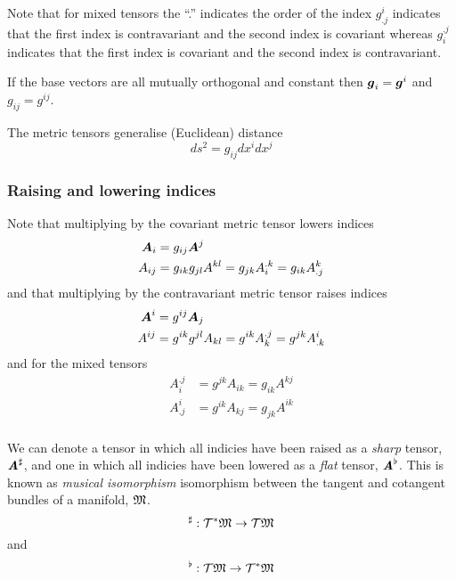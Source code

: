Note that for mixed tensors the ``.'' indicates the order of the index \ie
$g^{i}_{.j}$ indicates that the first index is contravariant and the second
index is covariant whereas $g_{i}^{.j}$ indicates that the first index is
covariant and the second index is contravariant.

If the base vectors are all mutually orthogonal and constant then
$ \boldsymbol{g} _{i}= \boldsymbol{g} ^{i}$ and $g_{ij}=g^{ij}$.

The metric tensors generalise (Euclidean) distance \ie
\begin{equation}
  ds^{2}=g_{ij}dx^{i}dx^{j}
\end{equation}

\subsubsection{Raising and lowering indices}

Note that multiplying by the covariant metric tensor lowers indices \ie
\begin{equation}
  \begin{split}
     \boldsymbol{A} _{i} &= g_{ij} \boldsymbol{A} ^{j} \\
    A_{ij} &= g_{ik}g_{jl}A^{kl} = g_{jk}A_{i}^{.k} = g_{ik}A^{k}_{.j} 
  \end{split}
\end{equation}
and that multiplying by the contravariant metric tensor raises indices \ie
\begin{equation}
  \begin{split}
   \boldsymbol{A} ^{i} &=  g^{ij} \boldsymbol{A} _{j} \\
   A^{ij} &= g^{ik}g^{jl}A_{kl} = g^{ik}A_{k}^{.j} = g^{jk}A^{i}_{.k}
  \end{split}
\end{equation}
and for the mixed tensors
\begin{equation}
  \begin{split}
  A_{i}^{.j} &= g^{jk}A_{ik} = g_{ik}A^{kj} \\
  A^{i}_{.j} &= g^{ik}A_{kj} = g_{jk}A^{ik} \\
  \end{split}
\end{equation}

We can denote a tensor in which all indicies have been raised as a
\emph{sharp} tensor, $ \boldsymbol{\mathit{A}}^{\sharp} $, and one in which all indicies have been lowered as a
\emph{flat} tensor, $\boldsymbol{\mathit{A}}^{\flat}$. This is known as \emph{musical isomorphism} \ie
isomorphism between the tangent and cotangent bundles of a manifold, $ \mathfrak{M} $.
\begin{equation}
    ^{\sharp} :   \mathcal{T} ^{*}   \mathfrak{M}  \rightarrow  \mathcal{T}   \mathfrak{M}   
\end{equation}
and
\begin{equation}
   ^{\flat}:  \mathcal{T}   \mathfrak{M}  \rightarrow   \mathcal{T} ^{*}   \mathfrak{M}   
\end{equation}

